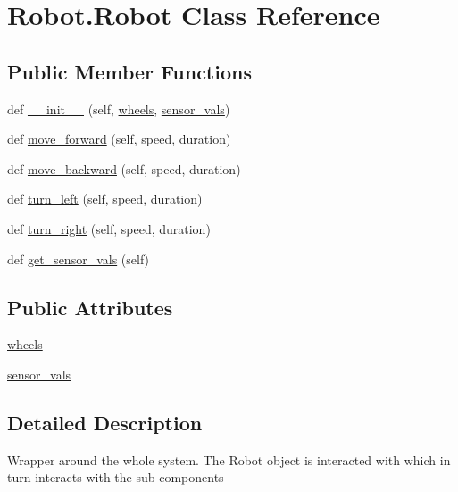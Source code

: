 \hypertarget{class_robot_1_1_robot}{}\section{Robot.\+Robot Class Reference}
\label{class_robot_1_1_robot}
\subsection*{Public Member Functions}
\begin{DoxyCompactItemize}
\item 
def \mbox{\hyperlink{class_robot_1_1_robot_a40c577b70d0dc59d0ea36c4418b4ebb8}{\+\_\+\+\_\+init\+\_\+\+\_\+}} (self, \mbox{\hyperlink{class_robot_1_1_robot_ac0e3d996cf1764a2b968186444554312}{wheels}}, \mbox{\hyperlink{class_robot_1_1_robot_a0d2df6b5b1ee9236e08f51468a22398d}{sensor\+\_\+vals}})
\item 
def \mbox{\hyperlink{class_robot_1_1_robot_ab1a6040ab6b4bde8fd8230b6f84cd8c8}{move\+\_\+forward}} (self, speed, duration)
\item 
def \mbox{\hyperlink{class_robot_1_1_robot_a4d9a177a012a52f6baee9c9dd7cb200b}{move\+\_\+backward}} (self, speed, duration)
\item 
def \mbox{\hyperlink{class_robot_1_1_robot_aeb19d8722b14e591d980f44887f5430b}{turn\+\_\+left}} (self, speed, duration)
\item 
def \mbox{\hyperlink{class_robot_1_1_robot_afd3797d558dd232b5c57ff1d2997024c}{turn\+\_\+right}} (self, speed, duration)
\item 
def \mbox{\hyperlink{class_robot_1_1_robot_a626830c7b3379821e487f14f44fe233d}{get\+\_\+sensor\+\_\+vals}} (self)
\end{DoxyCompactItemize}
\subsection*{Public Attributes}
\begin{DoxyCompactItemize}
\item 
\mbox{\hyperlink{class_robot_1_1_robot_ac0e3d996cf1764a2b968186444554312}{wheels}}
\item 
\mbox{\hyperlink{class_robot_1_1_robot_a0d2df6b5b1ee9236e08f51468a22398d}{sensor\+\_\+vals}}
\end{DoxyCompactItemize}


\subsection{Detailed Description}
\begin{DoxyVerb}Wrapper around the whole system.
The Robot object is interacted with which in turn interacts with the sub components
\end{DoxyVerb}
 

